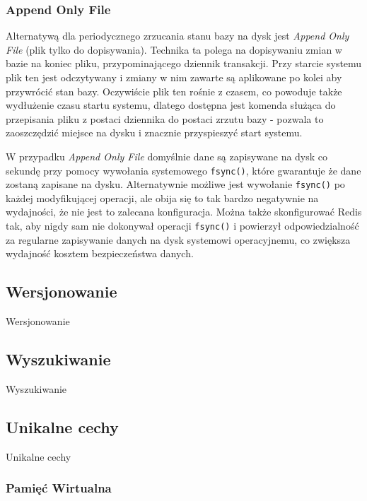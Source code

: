 \subsubsection*{Append Only File}

Alternatywą dla periodycznego zrzucania stanu bazy na dysk jest \emph{Append Only File} (plik tylko do dopisywania).
Technika ta polega na dopisywaniu zmian w bazie na koniec pliku, przypominającego dziennik transakcji.
Przy starcie systemu plik ten jest odczytywany i zmiany w nim zawarte są aplikowane po kolei aby przywrócić stan bazy.
Oczywiście plik ten rośnie z czasem, co powoduje także wydłużenie czasu startu systemu, dlatego dostępna jest komenda służąca do przepisania pliku z postaci dziennika do postaci zrzutu bazy - pozwala to zaoszczędzić miejsce na dysku i znacznie przyspieszyć start systemu.

W przypadku \emph{Append Only File} domyślnie dane są zapisywane na dysk co sekundę przy pomocy wywołania systemowego \verb+fsync()+, które gwarantuje że dane zostaną zapisane na dysku.
Alternatywnie możliwe jest wywołanie \verb+fsync()+ po każdej modyfikującej operacji, ale obija się to tak bardzo negatywnie na wydajności, że nie jest to zalecana konfiguracja.
Można także skonfigurować Redis tak, aby nigdy sam nie dokonywał operacji \verb+fsync()+ i powierzył odpowiedzialność za regularne zapisywanie danych na dysk systemowi operacyjnemu, co zwiększa wydajność kosztem bezpieczeństwa danych.

\subsection*{Wersjonowanie}

Wersjonowanie

\subsection*{Wyszukiwanie}

Wyszukiwanie

\subsection*{Unikalne cechy}

Unikalne cechy

\subsubsection*{Pamięć Wirtualna}

